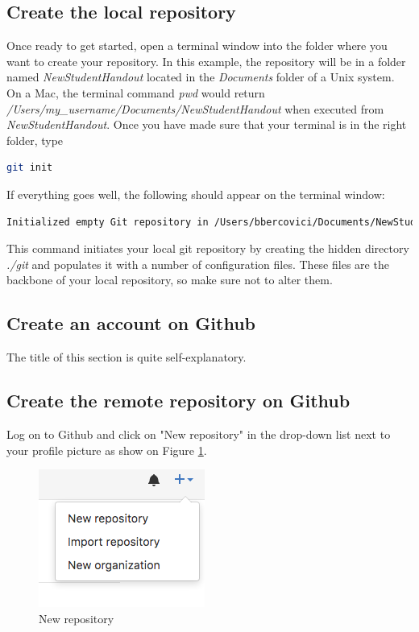 \documentclass{report}
\begin{document}
\subsection{Create the local repository}
Once ready to get started, open a terminal window into the folder where you want to create your repository. In this example, the repository will be in a folder named \textit{NewStudentHandout} located in the \textit{Documents} folder of a Unix system. On a Mac, the terminal command \textit{pwd} would return 
\textit{/Users/my\_username/Documents/NewStudentHandout} when executed from \textit{NewStudentHandout}. Once you have made sure that your terminal is in the right folder, type
\begin{lstlisting}[language=bash, caption=Creation of the local repository]
git init
\end{lstlisting}
If everything goes well, the following should appear on the terminal window:
\begin{lstlisting}[language=bash, caption=Successful git init message ]
Initialized empty Git repository in /Users/bbercovici/Documents/NewStudentHandout/.git/
\end{lstlisting}

This command initiates your local git repository by creating the hidden directory \textit{./git} and populates it with a number of configuration files. These files are the backbone of your local repository, so make sure not to alter them. 
\subsection{Create an account on Github}
The title of this section is quite self-explanatory.
\subsection{Create the remote repository on Github}
Log on to Github and click on "New repository" in the drop-down list next to your profile picture as show on Figure \ref{fig:new_repo}.
\begin{figure}[H]
\centering
\includegraphics[scale=0.5]{new_repo}
\caption{New repository}
\label{fig:new_repo}
\end{figure}
\end{document}
